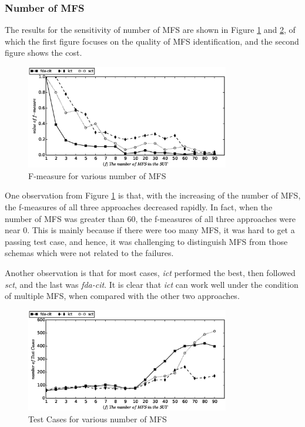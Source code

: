 \documentclass[10pt,journal,compsoc]{IEEEtran}
\begin{document}
\subsubsection{Number of MFS}
The results for the sensitivity of number of MFS are shown in Figure \ref{sen_mfs_f_measure_result} and \ref{sen_mfs_tests_result}, of which the first figure focuses on the quality of MFS identification, and the second figure shows the cost.

\begin{figure}[htbp]
 \includegraphics[width=3.5in]{sens_mfs_f_measure.eps}
\caption{F-measure for various number of MFS}
\label{sen_mfs_f_measure_result}
\end{figure}

One observation from Figure \ref{sen_mfs_f_measure_result} is that, with the increasing of the number of MFS, the f-measures of all three approaches decreased rapidly. In fact, when the number of MFS was greater than 60, the f-measures of all three approaches were near 0. This is mainly because if there were too many MFS, it was hard to get a passing test case, and hence, it was challenging to distinguish MFS from those schemas which were not related to the failures.

Another observation is that for most cases, \emph{ict} performed the best, then followed \emph{sct}, and the last was \emph{fda-cit}. It is clear that \emph{ict} can work well under the condition of multiple MFS, when compared with the other two approaches.



\begin{figure}[htbp]
 \includegraphics[width=3.5in]{sens_mfs_tests.eps}
\caption{Test Cases for various number of MFS}
\label{sen_mfs_tests_result}
\end{figure}
\end{document}
